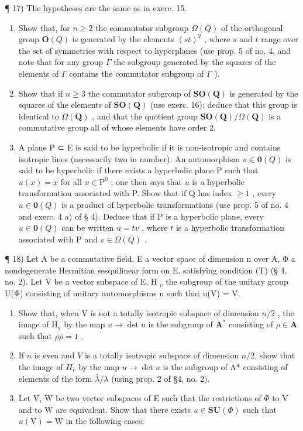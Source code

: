 ¶ 17) The hypotheses are the same as in exerc. 15.

\begin{enumerate}
\def\labelenumi{\alph{enumi})}
\item
  Show that, for \(n \geqslant 2\) the commutator subgroup \(\Omega(Q)\) of the orthogonal group \(\mathbf{O}(Q)\) is generated by the elements \((st)^{2}\) , where \(s\) and \(t\) range over the set of symmetries with respect to hyperplanes (use prop. 5 of no. 4, and note that for any group \(\Gamma\) the subgroup generated by the squares of the elements of \(\Gamma\) contains the commutator subgroup of \(\Gamma\) ).
\item
  Show that if \(n \geqslant 3\) the commutator subgroup of \(\mathbf{SO}(\mathbf{Q})\) is generated by the squares of the elements of \(\mathbf{SO}(\mathbf{Q})\) (use exerc. 16); deduce that this group is identical to \(\Omega(\mathbf{Q})\) , and that the quotient group \(\mathbf{SO}(\mathbf{Q})/\Omega(\mathbf{Q})\) is a commutative group all of whose elements have order 2.
\item
  A plane P ⊂ E is said to be hyperbolic if it is non-isotropic and contains isotropic lines (necessarily two in number). An automorphism \(u \in \mathbf{0}(Q)\) is said to be hyperbolic if there exists a hyperbolic plane P such that \(u(x) = x\) for all \(x \in \mathrm{P}^0\) ; one then says that \(u\) is a hyperbolic transformation associated with P. Show that if Q has index \(\geqslant 1\) , every \(u \in \mathbf{0}(Q)\) is a product of hyperbolic transformations (use prop. 5 of no. 4 and exerc. 4 a) of § 4). Deduce that if P is a hyperbolic plane, every \(u \in \mathbf{0}(Q)\) can be written \(u = tv\) , where \(t\) is a hyperbolic transformation associated with P and \(v \in \Omega(Q)\) .
\end{enumerate}

¶ 18) Let A be a commutative field, E a vector space of dimension n over A, Φ a nondegenerate Hermitian sesquilinear form on E, satisfying condition (T) (§ 4, no. 2). Let V be a vector subspace of E, H \(_{v}\) the subgroup of the unitary group U(Φ) consisting of unitary automorphisms u such that u(V) = V.

\begin{enumerate}
\def\labelenumi{\alph{enumi})}
\item
  Show that, when V is not a totally isotropic subspace of dimension \(n/2\) , the image of \(\mathrm{H}_{\mathrm{v}}\) by the map \(u \to \det u\) is the subgroup of \(\mathbf{A}^*\) consisting of \(\rho \in \mathbf{A}\) such that \(\rho \bar{\rho} = 1\) .
\item
  If \(n\) is even and \(V\) is a totally isotropic subspace of dimension \(n/2\), show that the image of \(H_{v}\) by the map \(u \rightarrow \det u\) is the subgroup of A* consisting of elements of the form \(\bar{\lambda}/\lambda\) (using prop. 2 of §4, no. 2).
\item
  Let V, W be two vector subspaces of E such that the restrictions of \(\Phi\) to V and to W are equivalent. Show that there exists \(u \in \mathbf{S}\mathbf{U}(\Phi)\) such that \(u(\mathrm{V}) = \mathrm{W}\) in the following cases:
\end{enumerate}

